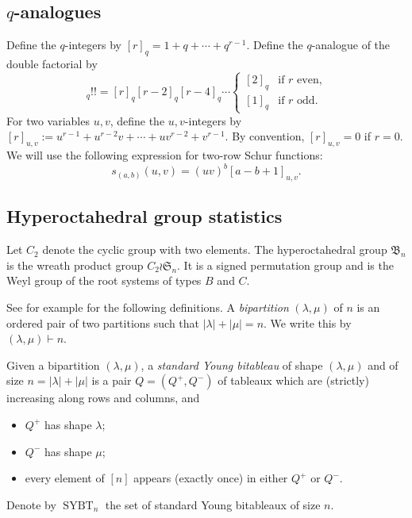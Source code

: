 \documentclass[12pt]{amsart}
\theoremstyle{plain}
\theoremstyle{definition}
\DeclareMathOperator{\SYBT}{SYBT}
\begin{document}
\subsection{\texorpdfstring{$q$}{q}-analogues}
Define the $q$-integers by $[r]_q = 1 + q + \cdots + q^{r-1}$.
Define the $q$-analogue of the double factorial by 
\begin{equation}
    [r]_q!! = [r]_q [r-2]_q [r-4]_q \cdots 
    \begin{cases}
        [2]_q & \text{if $r$ even,}\\
        [1]_q & \text{if $r$ odd.}
    \end{cases}
\end{equation}
For two variables $u,v$, define the $u,v$-integers by $[r]_{u,v} := u^{r-1} + u^{r-2} v + \cdots + u v^{r-2} + v^{r-1}$.
By convention, $[r]_{u,v} = 0$ if $r = 0$.
We will use the following expression for two-row Schur functions:
\begin{equation}\label{eq:two-row-schur}
    s_{(a,b)}(u,v) = (uv)^b [a-b+1]_{u,v}.
\end{equation}

\subsection{Hyperoctahedral group statistics}
Let $C_2$ denote the cyclic group with two elements. 
The hyperoctahedral group $\mathfrak{B}_n$ is the wreath product group $C_2 \wr \mathfrak{S}_n$. It is a signed permutation group and is the Weyl group of the root systems of types $B$ and $C$.

See for example \cite{MR3629266} for the following definitions.
A \emph{bipartition} $(\lambda,\mu)$ of $n$ is an ordered pair of two partitions such that $|\lambda| + |\mu| = n$.
We write this by $(\lambda, \mu) \vdash n$.

Given a bipartition $(\lambda,\mu)$, a \emph{standard Young bitableau} of shape $(\lambda,\mu)$ and of size $n = |\lambda| + |\mu|$ is a pair $Q = (Q^+, Q^-)$ of tableaux which are (strictly) increasing along rows and columns, and
\begin{itemize}
    \item $Q^+$ has shape $\lambda$;
    \item $Q^-$ has shape $\mu$;
    \item every element of $[n]$ appears (exactly once) in either $Q^+$ or $Q^-$.
\end{itemize}
Denote by $\SYBT_n$ the set of standard Young bitableaux of size $n$.
\end{document}

